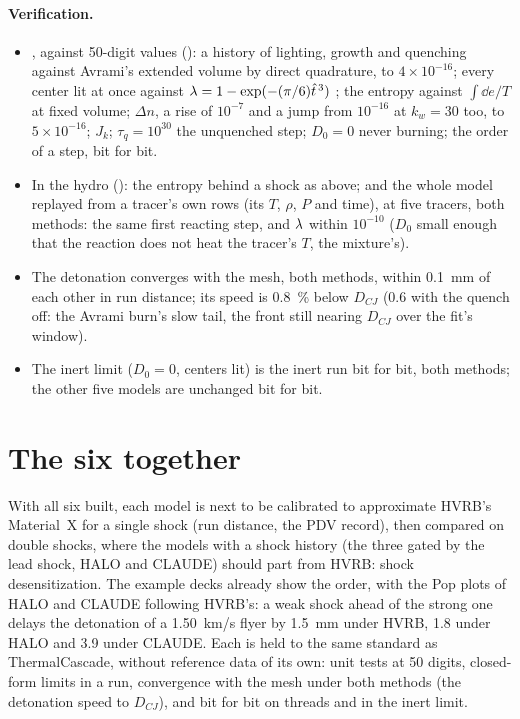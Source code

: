 \paragraph{Verification.}
\begin{itemize}
\item {}, against 50-digit values ():
  a history of lighting, growth and quenching against Avrami's extended
  volume by direct quadrature, to $4\times10^{-16}$; every center lit at
  once against $\lambda = 1 - \exp(-(\pi/6)\hat t^{\,3})$ \cite{hill2009}; the
  entropy against $\int\dd e/T$ at fixed volume; $\Delta n$, a rise of
  $10^{-7}$ and a jump from $10^{-16}$ at $k_w = 30$ too, to $5\times10^{-16}$;
  $J_k$; $\tau_q = 10^{30}$ the unquenched step;
  $D_0 = 0$ never burning; the order of a step, bit for bit.
\item In the hydro (): the entropy
  behind a shock as above; and the whole model replayed from a tracer's own
  rows (its $T$, $\rho$, $P$ and time), at five tracers, both methods: the
  same first reacting step, and $\lambda$ within $10^{-10}$ ($D_0$ small enough
  that the reaction does not heat the tracer's $T$, the mixture's).
\item The detonation converges with the mesh, both methods, within 0.1~mm
  of each other in run distance; its speed is 0.8~\% below $D_{CJ}$ (0.6
  with the quench off: the Avrami burn's slow tail, the front still
  nearing $D_{CJ}$ over the fit's window).
\item The inert limit ($D_0 = 0$, centers lit) is the inert run bit for bit,
  both methods; the other five models are unchanged bit for bit.
\end{itemize}

\section{The six together}
\label{sec:six-together}

With all six built, each model is next to be calibrated to approximate
HVRB's Material~X for a single shock (run distance, the PDV record), then
compared on double shocks, where the models with a shock history (the three
gated by the lead shock, HALO and CLAUDE) should part from HVRB: shock
desensitization. The example decks already show the order, with the Pop
plots of HALO and CLAUDE following HVRB's: a weak shock ahead of the strong
one delays the detonation of a 1.50~km/s flyer by 1.5~mm under HVRB, 1.8
under HALO and 3.9 under CLAUDE. Each
is held to the same standard as ThermalCascade, without reference data of
its own: unit tests at 50 digits, closed-form limits in a run, convergence
with the mesh under both methods (the detonation speed to $D_{CJ}$), and bit
for bit on threads and in the inert limit.
